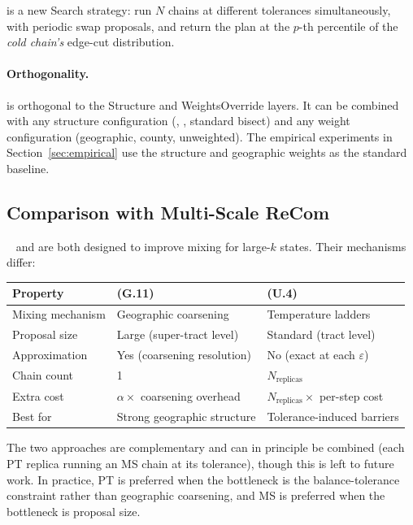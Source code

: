 \pt{} is a new Search strategy: run $N$ chains at different tolerances
simultaneously, with periodic swap proposals, and return the plan at the
$p$-th percentile of the \emph{cold chain's} edge-cut distribution.

\paragraph{Orthogonality.}
\pt{} is orthogonal to the Structure and WeightsOverride layers.
It can be combined with any structure configuration (\geosec{},
\ar{}, standard bisect) and any weight configuration (geographic,
county, unweighted).
The empirical experiments in Section~\ref{sec:empirical} use the
\geosec{} structure and geographic weights as the standard baseline.

\subsection{Comparison with Multi-Scale ReCom}

\ms{}~\citep{dellaLibera2026multiscale} and \pt{} are both designed to improve
mixing for large-$k$ states.
Their mechanisms differ:

\begin{center}
\renewcommand{\arraystretch}{1.25}
\begin{tabular}{@{}lll@{}}
\toprule
Property & \ms{} (G.11) & \pt{} (U.4) \\
\midrule
Mixing mechanism & Geographic coarsening & Temperature ladders \\
Proposal size & Large (super-tract level) & Standard (tract level) \\
Approximation & Yes (coarsening resolution) & No (exact \fr{} at each $\varepsilon$) \\
Chain count & 1 & $N_{\mathrm{replicas}}$ \\
Extra cost & $\alpha \times$ coarsening overhead & $N_{\mathrm{replicas}} \times$ per-step cost \\
Best for & Strong geographic structure & Tolerance-induced barriers \\
\bottomrule
\end{tabular}
\end{center}

The two approaches are complementary and can in principle be combined (each PT
replica running an MS chain at its tolerance), though this is left to future
work.
In practice, PT is preferred when the bottleneck is the balance-tolerance
constraint rather than geographic coarsening, and MS is preferred when the
bottleneck is proposal size.
